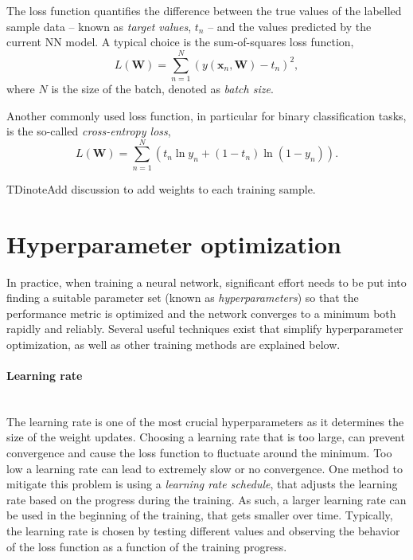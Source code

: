 The loss function quantifies the difference between the true values of the labelled sample data -- known as \emph{target values}, $t_n$ -- and the values predicted by the current NN model. A typical choice is the sum-of-squares loss function,
\begin{equation}
   L(\mathbf{W}) = \sum _{n=1}^{N}\left( y(\mathbf{x}_n, \mathbf{W})-t_n \right)^{2},
\end{equation}
where $N$ is the size of the batch, denoted as \emph{batch size}. 

Another commonly used loss function, in particular for binary classification tasks, is the so-called \emph{cross-entropy loss},
\begin{equation}
    L(\mathbf{W}) = \sum _{n=1}^{N}\left( t_n \ln y_n + ( 1 - t_n) \ln (1 - y_n) \right).
\end{equation}

TDinote{}{Add discussion to add weights to each training sample.}

\section{Hyperparameter optimization} 
In practice, when training a neural network, significant effort needs to be put into finding a suitable parameter set (known as \emph{hyperparameters}) so that the performance metric is optimized and the network converges to a minimum both rapidly and reliably. 
Several useful techniques exist that simplify hyperparameter optimization, as well as other training methods are explained below.

\paragraph{Learning rate} \mbox{}\\
The learning rate is one of the most crucial hyperparameters as it determines the size of the weight updates. Choosing a learning rate that is too large, can prevent convergence and cause the loss function to fluctuate around the minimum. Too low a learning rate can lead to extremely slow or no convergence. 
One method to mitigate this problem is using a \emph{learning rate schedule}, that adjusts the learning rate based on the progress during the training. As such, a larger learning rate can be used in the beginning of the training, that gets smaller over time.
Typically, the learning rate is chosen by testing different values and observing the behavior of the loss function as a function of the training progress.

